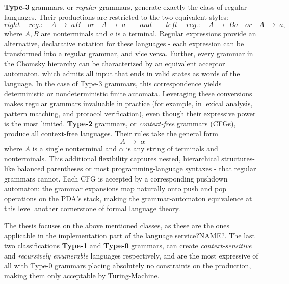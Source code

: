 \textbf{Type-3} grammars, or \emph{regular} grammars, generate exactly the class of regular languages. Their productions are restricted to the two equivalent styles:
\[
  right-reg.: \quad A \;\to\; aB \quad or \quad A \;\to\; a
  \qquad and \qquad
  left-reg.: \quad A \;\to\; Ba \quad or \quad A \;\to\; a,
\]
where \(A,B\) are nonterminals and \(a\) is a terminal. Regular expressions provide an alternative, declarative notation for these languages - each expression
can be transformed into a regular grammar, and vice versa. Further, every grammar in the Chomsky hierarchy can be characterized by an equivalent acceptor automaton, which admits all input that ends in valid states as words of the language.
In the case of Type-3 grammars, this correspondence yields deterministic or nondeterministic finite automata. Leveraging these conversions makes regular grammars
invaluable in practice (for example, in lexical analysis, pattern matching, and protocol verification), even though their expressive power is the most limited.
\textbf{Type-2} grammars, or \emph{context-free} grammars (CFGs), produce all context-free languages.
Their rules take the general form  \[A \;\to\; \alpha\] where \(A\) is a single nonterminal and \(\alpha\) is any string of terminals and nonterminals.
This additional flexibility captures nested, hierarchical structures-like balanced parentheses or most programming-language syntaxes - that regular grammars cannot.
Each CFG is accepted by a corresponding pushdown automaton: the grammar expansions map naturally onto push and pop operations on the PDA's stack, making the grammar-automaton
equivalence at this level another cornerstone of formal language theory.

The thesis focuses on the above mentioned classes, as these are the ones applicable in the implementation part of the language service?NAME?. The last two classifications
\textbf{Type-1} and \textbf{Type-0} grammars, can create \textit{context-sensitive} and \textit{recursively enumerable} languages respectively, and are the most expressive
of all with Type-0 grammars placing absolutely no constraints on the production, making them only acceptable by Turing-Machine.

